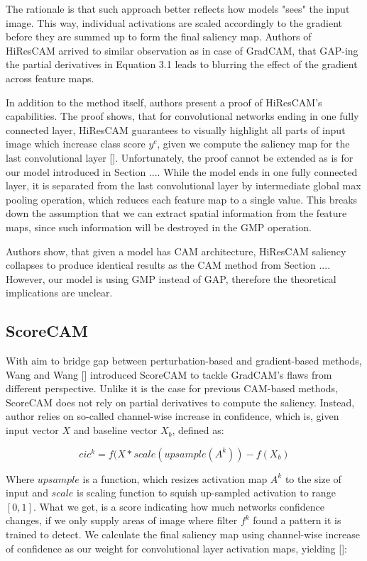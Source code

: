 The rationale is that such approach better reflects how models "sees" the input image. This way, individual activations are scaled accordingly to the gradient before they are summed up to form the final saliency map. Authors of HiResCAM arrived to similar observation as in case of GradCAM, that GAP-ing the partial derivatives in Equation 3.1 leads to blurring the effect of the gradient across feature maps. 

In addition to the method itself, authors present a proof of HiResCAM's capabilities. The proof shows, that for convolutional networks ending in one fully connected layer, HiResCAM guarantees to visually highlight all parts of input image which increase class score $y^c$, given we compute the saliency map for the last convolutional layer []. Unfortunately, the proof cannot be extended as is for our model introduced in Section .... While the model ends in one fully connected layer, it is separated from the last convolutional layer by intermediate global max pooling operation, which reduces each feature map to a single value. This breaks down the assumption that we can extract spatial information from the feature maps, since such information will be destroyed in the GMP operation. 

Authors show, that given a model has CAM architecture, HiResCAM saliency collapses to produce identical results as the CAM method from Section .... However, our model is using GMP instead of GAP, therefore the theoretical implications are unclear.


\subsection{ScoreCAM}

With aim to bridge gap between perturbation-based and gradient-based methods, Wang and Wang [] introduced ScoreCAM to tackle GradCAM's flaws from different perspective. Unlike it is the case for previous CAM-based methods, ScoreCAM does not rely on partial derivatives to compute the saliency. Instead, author relies on so-called channel-wise increase in confidence, which is, given input vector $X$ and baseline vector $X_b$, defined as:

\begin{equation}
    cic^k = f(X * scale(upsample(A^k)) - f(X_b)
\end{equation}

Where $upsample$ is a function, which resizes activation map $A^k$ to the size of input and $scale$ is scaling function to squish up-sampled activation to range $[0, 1]$. What we get, is a score indicating how much networks confidence changes, if we only supply areas of image where filter $f^k$ found a pattern it is trained to detect. We calculate the final saliency map using channel-wise increase of confidence as our weight for convolutional layer activation maps, yielding []:

